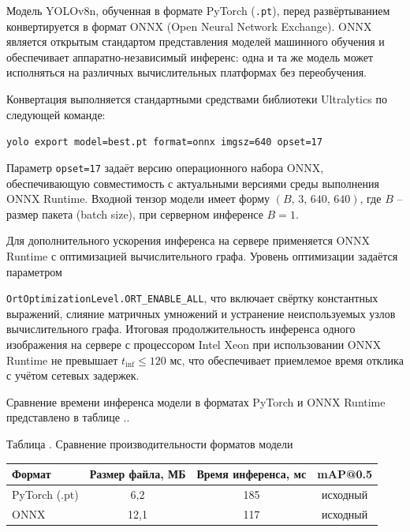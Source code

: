 {\gostFont

	\par \redline Модель YOLOv8n, обученная в формате PyTorch (\texttt{.pt}), перед развёртыванием конвертируется в формат ONNX (Open Neural Network Exchange).
	ONNX является открытым стандартом представления моделей машинного обучения и обеспечивает аппаратно-независимый инференс: одна и та же модель может исполняться на различных вычислительных платформах без переобучения.
	\par \redline Конвертация выполняется стандартными средствами библиотеки Ultralytics по следующей команде:

	\formulaspace
	\begin{Center}
		\texttt{yolo export model=best.pt format=onnx imgsz=640 opset=17}
	\end{Center}
	\formulaspace

	\par \redline Параметр \texttt{opset=17} задаёт версию операционного набора ONNX, обеспечивающую совместимость с актуальными версиями среды выполнения ONNX Runtime.
	Входной тензор модели имеет форму $(B,\, 3,\, 640,\, 640)$, где $B$ {--} размер пакета (batch size), при серверном инференсе $B = 1$.
	\par \redline Для дополнительного ускорения инференса на сервере применяется ONNX Runtime с оптимизацией вычислительного графа.
	Уровень оптимизации задаётся параметром
	\par \texttt{OrtOptimizationLevel.ORT\_ENABLE\_ALL}, что включает свёртку константных выражений, слияние матричных умножений и устранение неиспользуемых узлов вычислительного графа.
	Итоговая продолжительность инференса одного изображения на сервере с процессором Intel Xeon при использовании ONNX Runtime не превышает $t_{\mathrm{inf}} \leq 120$ мс, что обеспечивает приемлемое время отклика с учётом сетевых задержек.
	\par \redline Сравнение времени инференса модели в форматах PyTorch и ONNX Runtime представлено в таблице \thechaptercntr .\thetablecntr.
	
	\topTablespace
	{\begin{Center}
		\par \gostFont Таблица \thechaptercntr .\thetablecntr \spc {--} Сравнение производительности форматов модели

		\renewcommand{\arraystretch}{1.4} %
		\begin{tabular}{|l|c|c|c|}
			\hline
			Формат & Размер файла, МБ & Время инференса, мс & mAP@0.5 \\ \hline
			PyTorch (.pt)   & 6,2                       & 185                          & исходный         \\ \hline
			ONNX            & 12,1                      & 117                          & исходный         \\ \hline
		\end{tabular}
	\end{Center}}
	\botTablespace \addtocounter{tablecntr}{1}

}
